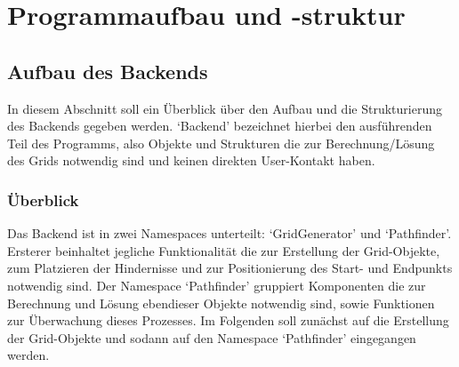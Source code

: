 \chapter{Programmaufbau und -struktur}
\label{ch:aufbau}

\section{Aufbau des Backends}
\label{sec:aufbau_backend}
In diesem Abschnitt soll ein Überblick über den Aufbau und die Strukturierung des Backends gegeben werden.
`Backend' bezeichnet hierbei den ausführenden Teil des Programms, also Objekte und Strukturen die zur Berechnung/Lösung des Grids notwendig sind und keinen direkten User-Kontakt haben.

\subsection{Überblick}
\label{subsec:aufbau_backend_ueberblick}
Das Backend ist in zwei Namespaces unterteilt: `GridGenerator' und `Pathfinder'.
Ersterer beinhaltet jegliche Funktionalität die zur Erstellung der Grid-Objekte, zum Platzieren der Hindernisse und zur Positionierung des Start- und Endpunkts notwendig sind.
Der Namespace `Pathfinder' gruppiert Komponenten die zur Berechnung und Lösung ebendieser Objekte notwendig sind, sowie Funktionen zur Überwachung dieses Prozesses.
Im Folgenden soll zunächst auf die Erstellung der Grid-Objekte und sodann auf den Namespace `Pathfinder' eingegangen werden.
